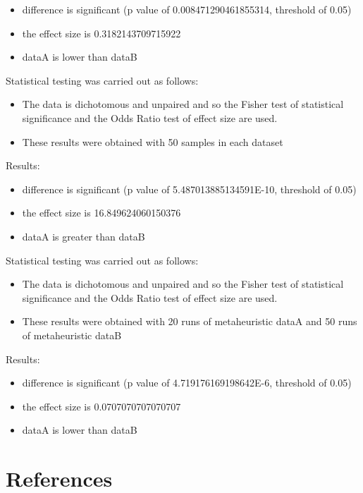 \documentclass[]{article}
\begin{document}
\begin{itemize}
\item{difference is significant (p value of 0.008471290461855314, threshold of 0.05)}
\item{the effect size is 0.3182143709715922}
\item{dataA is lower than dataB}
\end{itemize}Statistical testing was carried out as follows: \begin{itemize}
\item{The data is dichotomous and unpaired and so the Fisher test of statistical significance and the Odds Ratio test of effect size are used.}
\item{These results were obtained with 50 samples in each dataset}
\end{itemize}Results:
\begin{itemize}
\item{difference is significant (p value of 5.487013885134591E-10, threshold of 0.05)}
\item{the effect size is 16.849624060150376}
\item{dataA is greater than dataB}
\end{itemize}Statistical testing was carried out as follows: \begin{itemize}
\item{The data is dichotomous and unpaired and so the Fisher test of statistical significance and the Odds Ratio test of effect size are used.}
\item{These results were obtained with 20 runs of metaheuristic dataA and 50 runs of metaheuristic dataB}
\end{itemize}Results:
\begin{itemize}
\item{difference is significant (p value of 4.719176169198642E-6, threshold of 0.05)}
\item{the effect size is 0.0707070707070707}
\item{dataA is lower than dataB}
\end{itemize}

\section{References}

\end{document}
